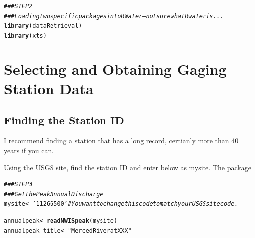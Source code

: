 \documentclass{article}\usepackage[]{graphicx}\usepackage[]{color}
\makeatletter
\newcommand{\hlstr}[1]{\textcolor[rgb]{0.192,0.494,0.8}{#1}}%
\newcommand{\hlcom}[1]{\textcolor[rgb]{0.678,0.584,0.686}{\textit{#1}}}%
\newcommand{\hlstd}[1]{\textcolor[rgb]{0.345,0.345,0.345}{#1}}%
\newcommand{\hlkwb}[1]{\textcolor[rgb]{0.69,0.353,0.396}{#1}}%
\newcommand{\hlkwd}[1]{\textcolor[rgb]{0.737,0.353,0.396}{\textbf{#1}}}%
\newenvironment{kframe}{%
 \def\at@end@of@kframe{}%
 \ifinner\ifhmode%
  \def\at@end@of@kframe{\end{minipage}}%
  \begin{minipage}{\columnwidth}%
 \fi\fi%
 \def\FrameCommand##1{\hskip\@totalleftmargin \hskip-\fboxsep
 \colorbox{shadecolor}{##1}\hskip-\fboxsep
     \hskip-\linewidth \hskip-\@totalleftmargin \hskip\columnwidth}%
 \MakeFramed {\advance\hsize-\width
   \@totalleftmargin\z@ \linewidth\hsize
   \@setminipage}}%
 {\par\unskip\endMakeFramed%
 \at@end@of@kframe}
\newenvironment{knitrout}{}{} %
\makeatother
\begin{document}
\begin{knitrout}
\color{fgcolor}\begin{kframe}
\begin{alltt}
\hlcom{### STEP 2}
\hlcom{### Loading two specific packages into RWater  -- not sure what Rwater is...}
\hlkwd{library}\hlstd{(dataRetrieval)}
\hlkwd{library}\hlstd{(xts)}
\end{alltt}


{\ttfamily\noindent\itshape\color{messagecolor}{\#\# Loading required package: zoo}}

{\ttfamily\noindent\itshape\color{messagecolor}{\#\# \\\#\# Attaching package: 'zoo'}}

{\ttfamily\noindent\itshape\color{messagecolor}{\#\# The following objects are masked from 'package:base':\\\#\# \\\#\#\ \ \ \  as.Date, as.Date.numeric}}\end{kframe}
\end{knitrout}


\section{Selecting and Obtaining Gaging Station Data}

\subsection{Finding the Station ID}

I recommend finding a station that has a long record, certianly more than 40 years if you can. 

Using the USGS site, find the station ID and enter below as mysite. The package 

\begin{knitrout}
\color{fgcolor}\begin{kframe}
\begin{alltt}
\hlcom{### STEP 3}
\hlcom{### Get the Peak Annual Discharge}
\hlstd{mysite}\hlkwb{<-}\hlstr{'11266500'} \hlcom{# You want to change this code to match your USGS site code. }

\hlstd{annualpeak}\hlkwb{<-}\hlkwd{readNWISpeak}\hlstd{(mysite)}
\hlstd{annualpeak_title} \hlkwb{<-} \hlstr{"Merced River at XXX"}
\end{alltt}
\end{kframe}
\end{knitrout}
\end{document}
